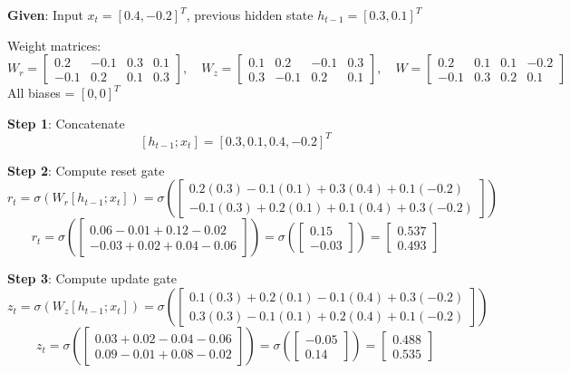 \documentclass[11pt,a4paper]{article}
\begin{document}
\begin{tcolorbox}[colback=green!5!white,colframe=green!75!black,title=\textbf{Worked Example 23: GRU Gate Computations}]
\textbf{Given}: Input $x_t = [0.4, -0.2]^T$, previous hidden state $h_{t-1} = [0.3, 0.1]^T$

Weight matrices:
\[
W_r = \begin{bmatrix} 0.2 & -0.1 & 0.3 & 0.1 \\ -0.1 & 0.2 & 0.1 & 0.3 \end{bmatrix}, \quad
W_z = \begin{bmatrix} 0.1 & 0.2 & -0.1 & 0.3 \\ 0.3 & -0.1 & 0.2 & 0.1 \end{bmatrix}, \quad
W = \begin{bmatrix} 0.2 & 0.1 & 0.1 & -0.2 \\ -0.1 & 0.3 & 0.2 & 0.1 \end{bmatrix}
\]
All biases = $[0, 0]^T$

\textbf{Step 1}: Concatenate
\[
[h_{t-1}; x_t] = [0.3, 0.1, 0.4, -0.2]^T
\]

\textbf{Step 2}: Compute reset gate
\[
r_t = \sigma(W_r [h_{t-1}; x_t]) = \sigma\left(\begin{bmatrix} 0.2(0.3) - 0.1(0.1) + 0.3(0.4) + 0.1(-0.2) \\ -0.1(0.3) + 0.2(0.1) + 0.1(0.4) + 0.3(-0.2) \end{bmatrix}\right)
\]
\[
r_t = \sigma\left(\begin{bmatrix} 0.06 - 0.01 + 0.12 - 0.02 \\ -0.03 + 0.02 + 0.04 - 0.06 \end{bmatrix}\right) = \sigma\left(\begin{bmatrix} 0.15 \\ -0.03 \end{bmatrix}\right) = \begin{bmatrix} 0.537 \\ 0.493 \end{bmatrix}
\]

\textbf{Step 3}: Compute update gate
\[
z_t = \sigma(W_z [h_{t-1}; x_t]) = \sigma\left(\begin{bmatrix} 0.1(0.3) + 0.2(0.1) - 0.1(0.4) + 0.3(-0.2) \\ 0.3(0.3) - 0.1(0.1) + 0.2(0.4) + 0.1(-0.2) \end{bmatrix}\right)
\]
\[
z_t = \sigma\left(\begin{bmatrix} 0.03 + 0.02 - 0.04 - 0.06 \\ 0.09 - 0.01 + 0.08 - 0.02 \end{bmatrix}\right) = \sigma\left(\begin{bmatrix} -0.05 \\ 0.14 \end{bmatrix}\right) = \begin{bmatrix} 0.488 \\ 0.535 \end{bmatrix}
\]


\end{tcolorbox}
\end{document}
